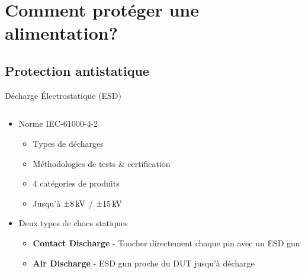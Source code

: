 
\section{Comment protéger une alimentation?}

\subsection{Protection antistatique}

\begin{frame}{Décharge Électrostatique (ESD)}
    \begin{columns}
        \begin{column}{0.66\textwidth}
            \begin{itemize}
                \item Norme IEC-61000-4-2
                \begin{itemize}
                    \item Types de décharges
                    \item Méthodologies de tests \& certification
                    \item 4 catégories de produits
                    \item Jusqu'à $\SI{\pm 8}{\kilo\volt}$ / $\SI{\pm 15}{\kilo\volt}$
                \end{itemize}
                \item Deux types de chocs statiques
                \begin{itemize}
                    \item \textbf{Contact Discharge} - Toucher directement chaque pin avec un ESD gun
                    \item \textbf{Air Discharge} - ESD gun proche du DUT jusqu'à décharge
                \end{itemize}
            \end{itemize}
        \end{column}


\end{columns}
\end{frame}
